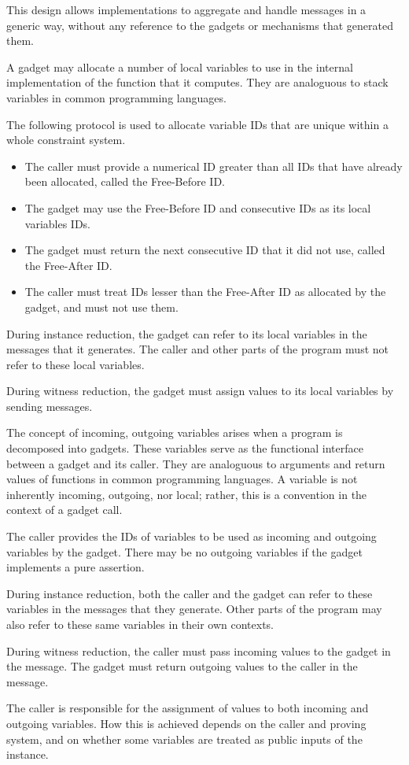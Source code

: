 	This design allows implementations to aggregate and handle messages in a generic way,
	without any	reference to the gadgets or mechanisms that generated them.

	A gadget may allocate a number of local variables to use
	in the internal implementation of the function that it computes.
	They are analoguous to stack variables in common programming languages.

	The following protocol is used to allocate variable IDs that are
	unique within a whole constraint system.
	\begin{itemize}
		\item The caller must provide a numerical ID greater than all IDs that have already been allocated, called the Free-Before ID.
		\item The gadget may use the Free-Before ID and consecutive IDs as its local variables IDs.
		\item The gadget must return the next consecutive ID that it did not use, called the Free-After ID.
		\item The caller must treat IDs lesser than the Free-After ID as allocated by the gadget,
			and must not use them.
	\end{itemize}

	During instance reduction, the gadget can refer to
	its local variables in the  messages that it generates.
	The caller and other parts of the program must not refer to these local variables.

	During witness reduction, the gadget must assign values to its local variables
	by sending  messages.


	The concept of incoming, outgoing variables arises when a program is decomposed into gadgets.
	These variables serve as the functional interface between a gadget and its caller.
	They are analoguous to arguments and return values of functions in common programming languages.
	A variable is not inherently incoming, outgoing, nor local;
	rather, this is a convention in the context of a gadget call.

	The caller provides the IDs of variables to be used as incoming and outgoing variables by the gadget.
	There may be no outgoing variables if the gadget implements a pure assertion.

	During instance reduction, both the caller and the gadget can refer to
	these variables in the  messages that they generate.
	Other parts of the program may also refer to these same variables in their own contexts.

	During witness reduction, the caller must pass incoming values to the gadget in the  message.
	The gadget must return outgoing values to the caller in the  message.

	The caller is responsible for the assignment of values to both incoming and outgoing variables.
	How this is achieved depends on the caller and proving system,
	and on whether some variables are treated as public inputs of the instance.
